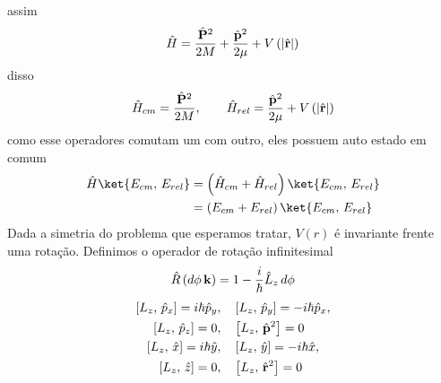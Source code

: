 \documentclass[12pt,brazil,table]{beamer}
\begin{document}
\begin{frame}
\begin{columns}[T]
    assim
    \[
     \hat{H}=\dfrac{\hat{\mathbf{P}}^2}{2M} + \dfrac{\hat{\mathbf{p}}^2}{2\mu} + V\left(  \left| \hat{\mathbf{r}} \right|\right)\vspace*{-0.25cm}  
    \]
    disso  \vspace*{-0.25cm}  
    \[
      \hat{H}_{cm} =\dfrac{\hat{\mathbf{P}}^2}{2M}, \qquad 
      \hat{H}_{rel} = \dfrac{\hat{\mathbf{p}}^2}{2\mu} + V\left(  \left| \hat{\mathbf{r}}\right|\right)\vspace*{-0.25cm}
    \]
    como esse operadores comutam um com outro, eles possuem auto estado em comum\vspace*{-0.25cm}  
    \[
      \begin{align*}
        \hat{H}\ket{E_{cm},\,E_{rel}} &=\left( \hat{H}_{cm} + \hat{H}_{rel}\right)\ket{E_{cm},\,E_{rel}}\\
        &=\left( E_{cm} + E_{rel}\right)\ket{E_{cm},\,E_{rel}}
      \end{align*}\vspace*{-0.25cm}   
    \]
    Dada a simetria do problema que esperamos tratar, $V(r)$ é invariante frente uma rotação. Definimos o operador de rotação infinitesimal\vspace*{-0.25cm}
    \[
      \hat{R}\left( d\phi\, \mathbf{k}\right) = 1-\dfrac{i}{\hbar}\hat{L}_z\,d\phi\vspace*{-0.25cm}
    \]
    \[
      \begin{align*}
        \left[L_z,\, \hat{p}_x\right]=i\hbar \hat{p}_y,\quad &
        \left[L_z,\, \hat{p}_y\right]=-i\hbar \hat{p}_x,\\
        \left[L_z,\, \hat{p}_z\right]=0,\quad &
        \left[L_z,\, \hat{\mathbf{p}}^2\right]=0\\
        \left[L_z,\, \hat{x}\right]=i\hbar \hat{y},\quad &
        \left[L_z,\, \hat{y}\right]=-i\hbar \hat{x},\\
        \left[L_z,\, \hat{z}\right]=0,\quad &
        \left[L_z,\, \hat{\mathbf{r}}^2\right]=0\\
      \end{align*}\vspace*{-0.25cm}
  \]


  \end{columns}

\end{frame}

\end{document}
